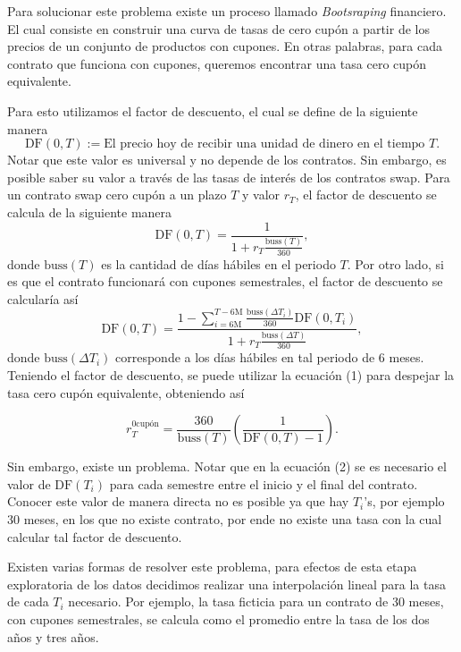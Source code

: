\qquad Para solucionar este problema existe un proceso llamado \textit{Bootsraping} financiero. El cual consiste en construir una curva de tasas de cero cupón a partir de los precios de un conjunto de productos con cupones. En otras palabras, para cada contrato que funciona con cupones, queremos encontrar una tasa cero cupón equivalente.

\qquad Para esto utilizamos el factor de descuento, el cual se define de la siguiente manera
$$ \text{DF}(0,T) := \text{El precio hoy de recibir una unidad de dinero en el tiempo } T.$$
Notar que este valor es universal y no depende de los contratos. Sin embargo, es posible saber su valor a través de las tasas de interés de los contratos swap. Para un contrato swap cero cupón a un plazo $T$ y valor $r_T$, el factor de descuento se calcula de la siguiente manera
\begin{equation}
    \text{DF}(0,T) = \dfrac{1}{1 + r_T \frac{\text{buss}(T)}{360}},
\end{equation}
donde $\text{buss}(T)$ es la cantidad de días hábiles en el periodo $T$. Por otro lado, si es que el contrato funcionará con cupones semestrales, el factor de descuento se calcularía así
\begin{equation}
    \text{DF}(0,T) = \dfrac{1 - \sum_{i= 6\text{M}}^{T - 6\text{M}} \frac{\text{buss}(\Delta T_i)}{360} \text{DF}(0, T_i)}{1 + r_T \frac{\text{buss}(\Delta T)}{360}},
\end{equation}
donde $\text{buss}(\Delta T_i)$ corresponde a los días hábiles en tal periodo de 6 meses. Teniendo el factor de descuento, se puede utilizar la ecuación (1) para despejar la tasa cero cupón equivalente, obteniendo así

\begin{equation}
    r_T^{\text{0cupón}} = \dfrac{360}{\text{buss}(T)}\left( \dfrac{1}{\text{DF}(0,T) - 1}\right).
\end{equation}

\qquad Sin embargo, existe un problema. Notar que en la ecuación (2) se es necesario el valor de $\text{DF}(T_i)$ para cada semestre entre el inicio y el final del contrato. Conocer este valor de manera directa no es posible ya que hay $T_i$'s, por ejemplo 30 meses, en los que no existe contrato, por ende no existe una tasa con la cual calcular tal factor de descuento.

\qquad Existen varias formas de resolver este problema, para efectos de esta etapa exploratoria de los datos decidimos realizar una interpolación lineal para la tasa de cada $T_i$ necesario. Por ejemplo, la tasa ficticia para un contrato de 30 meses, con cupones semestrales, se calcula como el promedio entre la tasa de los dos años y tres años.

